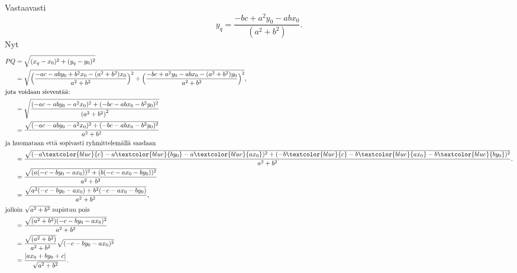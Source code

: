 Vastaavasti
\[
y_q = \frac{-bc+a^2y_0-abx_0}{(a^2+b^2)}.
\]
Nyt
\begin{align*}
  PQ &= \sqrt{(x_q-x_0)^2+(y_q-y_0)^2} \\
  &= \sqrt{\Big(\frac{-ac-aby_0+b^2x_0-(a^2+b^2)x_0}{a^2+b^2}\Big)^2+\Big(\frac{-bc+a^2y_0-abx_0-(a^2+b^2)y_0}{a^2+b^2}\Big)^2}, \\
  \intertext{jota voidaan sieventää:}
  & = \sqrt{\frac{(-ac-aby_0-a^2x_0)^2+(-bc-abx_0-b^2 y_0)^2}{\left(a^2+b^2\right)^2}} \\
  & = \frac{\sqrt{(-ac-aby_0-a^2x_0)^2+(-bc-abx_0-b^2 y_0)^2}}{a^2+b^2} \\
  \intertext{ja huomataan että sopivasti ryhmittelemällä saadaan} 
  & = \frac{\sqrt{(-a\textcolor{blue}{c}-a\textcolor{blue}{by_0}-a\textcolor{blue}{ax_0})^2+
  (-b\textcolor{blue}{c}-b\textcolor{blue}{ax_0}-b\textcolor{blue}{by_0})^2}}{a^2+b^2}. \\
  & = \frac{\sqrt{(a(-c-by_0-ax_0))^2+(b(-c-ax_0-by_0))^2}}{a^2+b^2} \\
  & = \frac{\sqrt{a^2(-c-by_0-ax_0)+b^2(-c-ax_0-by_0)}}{a^2+b^2}, \\
  \intertext{jolloin  $\sqrt{a^2 + b^2}$ supistuu pois}
  & = \frac{\sqrt{(a^2+b^2)(-c-by_0-ax_0)^2}}{a^2+b^2} \\
  & = \frac{\sqrt{(a^2+b^2)}}{a^2+b^2}\sqrt{(-c-by_0-ax_0)^2} \\
  & = \frac{|ax_0+by_0+c|}{\sqrt{a^2+b^2}}.
\end{align*}
